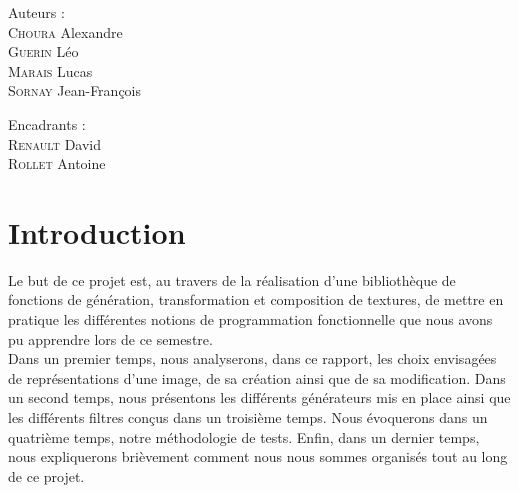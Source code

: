 \documentclass[11pt]{article}
\begin{document}
\begin{titlepage}
\begin{minipage}[b]{0.40\linewidth}
        \flushleft 
        \large
        Auteurs : 
        \\
        \textsc{Choura} Alexandre
        \\
        \textsc{Guerin} Léo
        \\
        \textsc{Marais} Lucas
        \\
        \textsc{Sornay} Jean-François
    \end{minipage} \hfill
    \begin{minipage}[b]{0.40\linewidth}
        \flushright 
        \large 
        Encadrants : 
        \\
        \textsc{Renault} David
        \\
        \textsc{Rollet} Antoine
    \end{minipage} \hfill

\end{titlepage}

\newpage




\tableofcontents




\newpage
\section{Introduction}
\label{section:introduction}

Le but de ce projet est, au travers de la réalisation d'une bibliothèque de fonctions de génération, transformation et composition de textures, de mettre en pratique les différentes notions de programmation fonctionnelle que nous avons pu apprendre lors de ce semestre. \\

Dans un premier temps, nous analyserons, dans ce rapport, les choix envisagées de représentations d'une image, de sa création ainsi que de sa modification. Dans un second temps, nous présentons les différents générateurs mis en place ainsi que les différents filtres conçus dans un troisième temps. Nous évoquerons dans un quatrième temps, notre méthodologie de tests. Enfin, dans un dernier temps, nous expliquerons brièvement comment nous nous sommes organisés tout au long de ce projet.
\end{document}
